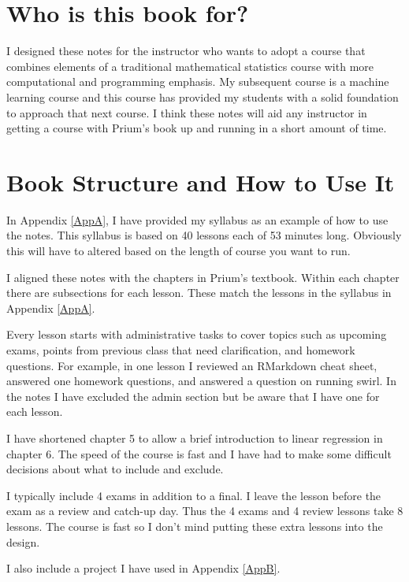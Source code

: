 \documentclass[]{book}
\theoremstyle{definition}
\theoremstyle{definition}
\theoremstyle{definition}
\theoremstyle{remark}
\begin{document}
\section{Who is this book for?}\label{who-is-this-book-for}

I designed these notes for the instructor who wants to adopt a course
that combines elements of a traditional mathematical statistics course
with more computational and programming emphasis. My subsequent course
is a machine learning course and this course has provided my students
with a solid foundation to approach that next course. I think these
notes will aid any instructor in getting a course with Prium's book up
and running in a short amount of time.

\section{Book Structure and How to Use
It}\label{book-structure-and-how-to-use-it}

In Appendix \ref{AppA}, I have provided my syllabus as an example of how
to use the notes. This syllabus is based on 40 lessons each of 53
minutes long. Obviously this will have to altered based on the length of
course you want to run.

I aligned these notes with the chapters in Prium's textbook. Within each
chapter there are subsections for each lesson. These match the lessons
in the syllabus in Appendix \ref{AppA}.

Every lesson starts with administrative tasks to cover topics such as
upcoming exams, points from previous class that need clarification, and
homework questions. For example, in one lesson I reviewed an RMarkdown
cheat sheet, answered one homework questions, and answered a question on
running swirl. In the notes I have excluded the admin section but be
aware that I have one for each lesson.

I have shortened chapter 5 to allow a brief introduction to linear
regression in chapter 6. The speed of the course is fast and I have had
to make some difficult decisions about what to include and exclude.

I typically include 4 exams in addition to a final. I leave the lesson
before the exam as a review and catch-up day. Thus the 4 exams and 4
review lessons take 8 lessons. The course is fast so I don't mind
putting these extra lessons into the design.

I also include a project I have used in Appendix \ref{AppB}.
\end{document}
